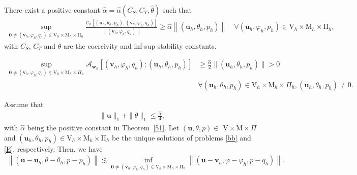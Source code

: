 \documentclass[10pt,a4paper]{amsart}
\begin{document}
  		\begin{theorem}\label{51}
  			There exist a positive constant $\hat{\alpha}= \hat{\alpha}(C_S,C_T,\hat{\theta})$ such that 
  			\begin{align*}
  			\sup _{\boldsymbol{0} \neq (\boldsymbol{v}_h,\varphi_h , q_h) \in \mathrm{V}_h \times \mathrm{M}_h \times  \mathrm{\Pi}_h}\frac{\mathcal{C}_h\left[\left( \boldsymbol{u}_h, \theta_h, p_h\right);\left( \boldsymbol{v}_h, \varphi_h, q_h \right)\right]}{\left\|\left( \boldsymbol{v}_h, \varphi_h, q_h \right)\right\|} \geq \hat{\alpha}\left\|\left(\boldsymbol{u}_h,\theta_h, p_h\right)\right\| \quad \forall\left( \boldsymbol{u}_h,\varphi_h,p_h\right) \in \mathrm{V}_h \times \mathrm{M}_h \times \mathrm{\Pi}_h,
  			\end{align*}
  			with $C_S$, $C_T$ and $\hat{\theta}$ are the coercivity and inf-sup stability constants. 
  		\end{theorem}

  			\begin{align}\label{37}
  			\sup _{\boldsymbol{0} \neq (\boldsymbol{v}_h, \varphi_h, q_h) \in \mathrm{V}_h \times \mathrm{M}_h \times \Pi_h} \mathcal{A}_{\boldsymbol{w}_h}\left[(\boldsymbol{v}_h, \varphi_h, q_h);(\boldsymbol{u}_h, \theta_h, p_h)\right] & \geq \frac{\hat{\alpha}}{2}\|(\boldsymbol{u}_h, \theta_h, p_h)\| >0  \\ & \forall(\boldsymbol{u}_h,\theta_h, p_h) \in \mathrm{V}_h \times \mathrm{M}_h \times \Pi_h,(\boldsymbol{u}_h, \theta_h, p_h) \neq 0.
  			\end{align}

  		\begin{theorem}\label{RR1}
  			Assume that
  			\begin{align}\label{57}
  			\| \boldsymbol{u} \|_{1}    + \| \theta \|_{1} \leq \frac{\hat{\alpha}}{4},
  			\end{align}
  			with $\hat{\alpha}$ being the positive constant in Theorem~\ref{51}. Let $(\boldsymbol{u},\theta, p) \in$ $\mathrm{V} \times \mathrm{M} \times \Pi$ and $\left(\boldsymbol{u}_h,\theta_h,p_h \right) \in \mathrm{V}_h \times \mathrm{M}_h \times\mathrm{\Pi}_h$ be the unique solutions of problems \eqref{bb} and \eqref{E}, respectively. Then, we have 
  			\begin{align}\label{58}
  			\left\|\left( \boldsymbol{u}-\boldsymbol{u}_h, \theta - \theta_h, p - p_h \right)\right\| \lesssim  \inf _{\boldsymbol{0} \neq  \left(\boldsymbol{v}_h,\varphi_h,q_h \right) \in \mathrm{V}_h \times \mathrm{M}_h \times  \mathrm{\Pi}_h}\left\|\left(\boldsymbol{u}-\boldsymbol{v}_h, \varphi - \varphi_h, p-q_h \right)\right\|.
  			\end{align}	
  		\end{theorem} 
\end{document}
